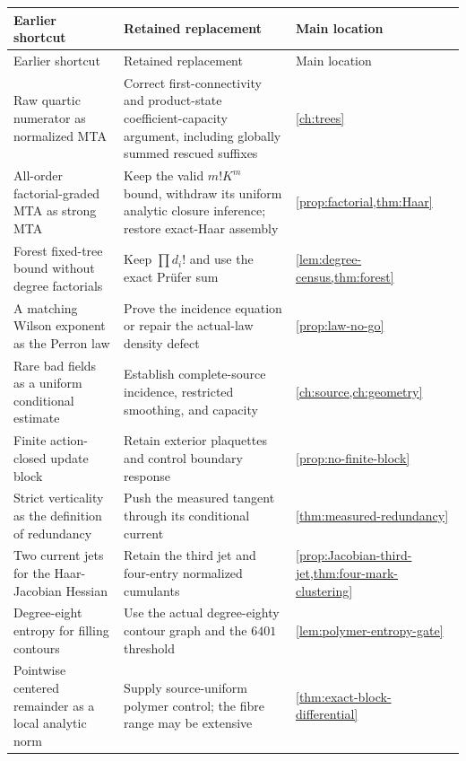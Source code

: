\documentclass[11pt,oneside,openany]{book}
\theoremstyle{definition}
\theoremstyle{remark}
\begin{document}
\begin{longtable}{L{0.24\textwidth}L{0.49\textwidth}L{0.17\textwidth}}
\toprule Earlier shortcut & Retained replacement & Main location \\ \midrule
\endfirsthead
\toprule Earlier shortcut & Retained replacement & Main location \\ \midrule
\endhead
Raw quartic numerator as normalized MTA & Correct first-connectivity and product-state coefficient-capacity argument, including globally summed rescued suffixes & \cref{ch:trees} \\
All-order factorial-graded MTA as strong MTA & Keep the valid $m!K^m$ bound, withdraw its uniform analytic closure inference; restore exact-Haar assembly & \cref{prop:factorial,thm:Haar} \\
Forest fixed-tree bound without degree factorials & Keep $\prod d_i!$ and use the exact Pr\"ufer sum & \cref{lem:degree-census,thm:forest} \\
A matching Wilson exponent as the Perron law & Prove the incidence equation or repair the actual-law density defect & \cref{prop:law-no-go} \\
Rare bad fields as a uniform conditional estimate & Establish complete-source incidence, restricted smoothing, and capacity & \cref{ch:source,ch:geometry} \\
Finite action-closed update block & Retain exterior plaquettes and control boundary response & \cref{prop:no-finite-block} \\
Strict verticality as the definition of redundancy & Push the measured tangent through its conditional current & \cref{thm:measured-redundancy} \\
Two current jets for the Haar-Jacobian Hessian & Retain the third jet and four-entry normalized cumulants & \cref{prop:Jacobian-third-jet,thm:four-mark-clustering} \\
Degree-eight entropy for filling contours & Use the actual degree-eighty contour graph and the $6401$ threshold & \cref{lem:polymer-entropy-gate} \\
Pointwise centered remainder as a local analytic norm & Supply source-uniform polymer control; the fibre range may be extensive & \cref{thm:exact-block-differential} \\


\end{longtable}
\end{document}
